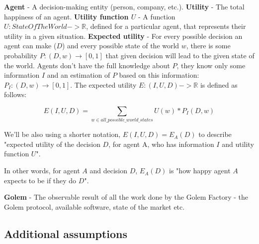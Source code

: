 \documentclass{article}
\begin{document}
\textbf{Agent} - A decision-making entity (person, company, etc.).
\newline
\textbf{Utility} - The total happiness of an agent.
\newline
\textbf{Utility function $U$} - A function $U: StateOfTheWorld -> \mathbb{R}$, defined for a particular agent, that represents their utility in a given situation.
\newline
\textbf{Expected utility} - For every possible decision an agent can make ($D$) and every possible state of the world $w$, there is some probability $P: (D, w) \rightarrow [0, 1]$  that given decision will lead to the given state of the world.
Agents don't have the full knowledge about $P$, they know only some information $I$ and an estimation of $P$ based on this information: $P_I: (D, w) \rightarrow [0, 1]$. The expected utility $E: (I, U, D) -> \mathbb{R}$ is defined as follows:

\begin{equation}
E(I, U, D) = \sum_{w \in all\_possible\_world\_states}U(w) * P_I(D, w)
\end{equation}

We'll be also using a shorter notation, $E(I, U, D) = E_A(D)$ to describe "expected utility of the decision $D$, for agent A, who has information $I$ and utility function $U$".

In other words, for agent $A$ and decision $D$, $E_A(D)$ is "how happy agent $A$ expects to be if they do $D$".
\newline

\textbf{Golem} - The observable result of all the work done by the Golem Factory - the Golem protocol, available software, state of the market etc.
\newline

\subsection{Additional assumptions}
\end{document}
